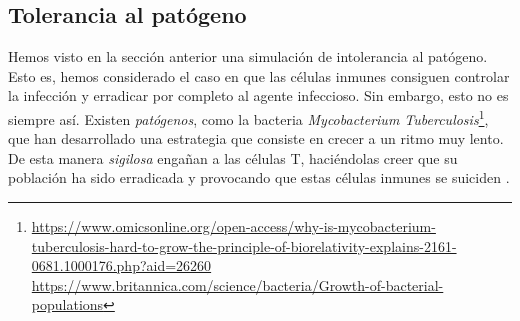 %		
%



\subsection{Tolerancia al patógeno}
\label{sim:toler}

Hemos visto en la sección anterior una simulación de intolerancia al patógeno. Esto es, hemos considerado el caso en que las células inmunes consiguen controlar la infección y erradicar por completo al agente infeccioso. Sin embargo, esto no es siempre así. Existen \textit{patógenos}, como la bacteria \textit{Mycobacterium Tuberculosis}\footnote{\url{https://www.omicsonline.org/open-access/why-is-mycobacterium-tuberculosis-hard-to-grow-the-principle-of-biorelativity-explains-2161-0681.1000176.php?aid=26260} \\ \url{https://www.britannica.com/science/bacteria/Growth-of-bacterial-populations}}, que han desarrollado una estrategia que consiste en crecer a un ritmo muy lento. De esta manera \textit{sigilosa} engañan a las células T, haciéndolas creer que su población ha sido erradicada y provocando que estas células inmunes se suiciden \citep{leggett2017growth}.


